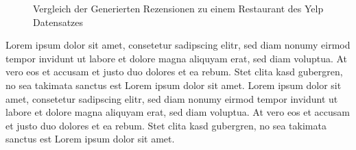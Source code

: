 \begin{figure}[!h]
    \centering
    \scriptsize
    \caption{Vergleich der Generierten Rezensionen zu einem Restaurant des Yelp Datensatzes}
\end{figure}
Lorem ipsum dolor sit amet, consetetur sadipscing elitr, sed diam nonumy eirmod tempor invidunt ut labore et dolore magna aliquyam erat, sed diam voluptua. At vero eos et accusam et justo duo dolores et ea rebum. Stet clita kasd gubergren, no sea takimata sanctus est Lorem ipsum dolor sit amet. Lorem ipsum dolor sit amet, consetetur sadipscing elitr, sed diam nonumy eirmod tempor invidunt ut labore et dolore magna aliquyam erat, sed diam voluptua. At vero eos et accusam et justo duo dolores et ea rebum. Stet clita kasd gubergren, no sea takimata sanctus est Lorem ipsum dolor sit amet.

\pagebreak
